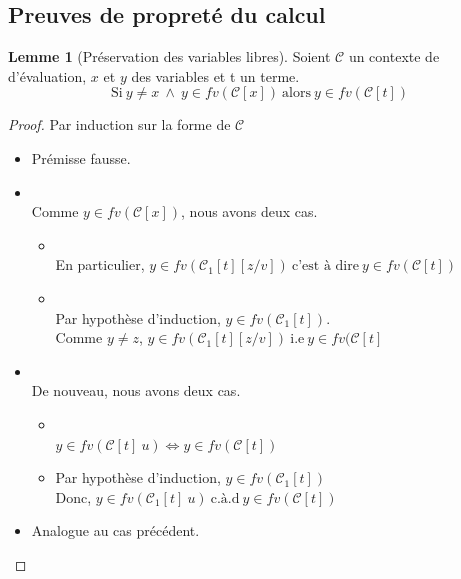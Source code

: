\documentclass[11pt,a4paper]{article}
\theoremstyle{definition}
\newtheorem{lemma}[theorem]{Lemme}
\begin{document}
\subsection{Preuves de propreté du calcul}
\begin{lemma}[Préservation des variables libres]
  \label{lemmapresfv}
  Soient $\mathcal{C}$ un contexte de d'évaluation, $x$ et $y$ des variables et t un terme.
  \[
    \text{Si}~y \neq x~\wedge~y\in fv(\mathcal{C}[x])~\text{alors}~y \in fv(\mathcal{C}[t])
  \]
\end{lemma}
\begin{proof}
Par induction sur la forme de $\mathcal{C}$
 \begin{itemize}
    \item {} Prémisse fausse.
    \item {}\\
      Comme $y\in fv(\mathcal{C}[x])$, nous avons deux cas.
      \begin{itemize}
        \item {}\\ 
          En particulier, $y \in fv(\mathcal{C}_1[t][z/v])~\text{c'est à dire}~y \in fv(\mathcal{C}[t])$
        \item {}\\
          Par hypothèse d'induction, $y\in fv(\mathcal{C}_1[t])$.\\
          Comme $y \neq z$, $y\in fv(\mathcal{C}_1[t][z/v])~\text{i.e}~y \in fv(\mathcal{C}[t]$ 
      \end{itemize}
    \item {}\\
      De nouveau, nous avons deux cas.
      \begin{itemize}
        \item {}\\
          $ y \in fv(\mathcal{C}[t]~u) \Leftrightarrow y \in fv(\mathcal{C}[t])$
        \item {}
          Par hypothèse d'induction, $y \in fv(\mathcal{C}_1[t])$\\ 
          Donc, $y \in fv(\mathcal{C}_1[t]~u)~\text{c.à.d}~y \in fv(\mathcal{C}[t])$
      \end{itemize}
    \item {} Analogue au cas précédent.
  \end{itemize} 
\end{proof}
\end{document}

